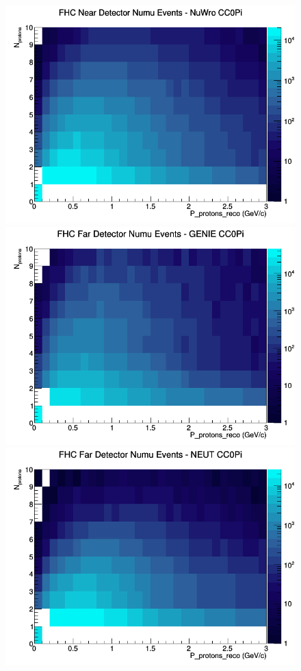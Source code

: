 \documentclass[12pt]{article}
\begin{document}
\begin{figure}[h]
\includegraphics[width=\linewidth]{eff_N_P/GAr/protons/CC0Pi_FHC_ND_numu_N_P_NuWro.png}
\endminipage
\newline
{}
\includegraphics[width=\linewidth]{eff_N_P/GAr/protons/CC0Pi_FHC_FD_numu_N_P_GENIE.png}
\endminipage
{}
\includegraphics[width=\linewidth]{eff_N_P/GAr/protons/CC0Pi_FHC_FD_numu_N_P_NEUT.png}

\end{figure}
\end{document}
